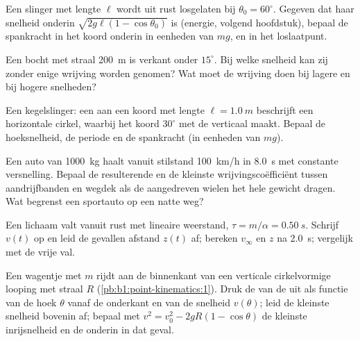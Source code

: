 \begin{exercise}[$\star\star$]\label{exo:b1:newton-dynamics:7}
Een slinger met lengte $\ell$ wordt uit rust losgelaten bij $\theta_0 = 60^\circ$.
Gegeven dat haar snelheid onderin $\sqrt{2g\ell(1 - \cos\theta_0)}$ is
(energie, volgend hoofdstuk), bepaal de spankracht in het koord onderin in eenheden
van $mg$, en in het loslaatpunt.
\end{exercise}

\begin{exercise}[$\star\star$]\label{exo:b1:newton-dynamics:8}
Een bocht met straal \qty{200}{m} is verkant onder $15^\circ$. Bij welke snelheid kan
zij zonder enige wrijving worden genomen? Wat moet de wrijving doen bij lagere en
bij hogere snelheden?
\end{exercise}

\begin{exercise}[$\star\star$]\label{exo:b1:newton-dynamics:9}
Een kegelslinger: een  aan een koord met lengte $\ell = \qty{1.0}{m}$
beschrijft een horizontale cirkel, waarbij het koord $30^\circ$ met de
verticaal maakt. Bepaal de hoeksnelheid, de periode en de spankracht (in
eenheden van $mg$).
\end{exercise}

\begin{exercise}[$\star\star\star$]\label{exo:b1:newton-dynamics:10}
Een auto van \qty{1000}{kg} haalt vanuit stilstand \qty{100}{km/h} in \qty{8.0}{s}
met constante versnelling. Bepaal de resulterende  en de kleinste
wrijvingscoëfficiënt tussen aandrijfbanden en wegdek als de aangedreven
wielen het hele gewicht dragen. Wat begrenst een sportauto op een natte weg?
\end{exercise}

\begin{exercise}[$\star\star\star$]\label{exo:b1:newton-dynamics:11}
Een lichaam valt vanuit rust met lineaire weerstand, $\tau = m/\alpha = \qty{0.50}{s}$.
Schrijf $v(t)$ op en leid de gevallen afstand $z(t)$ af; bereken $v_\infty$
en $z$ na \qty{2.0}{s}; vergelijk met de vrije val.
\end{exercise}

\begin{exercise}[$\star\star\star$]\label{exo:b1:newton-dynamics:12}
Een wagentje met  $m$ rijdt aan de binnenkant van een verticale cirkelvormige looping met
straal $R$ (\cref{pb:b1:point-kinematics:1}). Druk de  van de 
uit als functie van de hoek $\theta$ vanaf de onderkant en
van de snelheid $v(\theta)$; leid de kleinste snelheid bovenin af; bepaal met
$v^2 = v_0^2 - 2gR(1 - \cos\theta)$ de kleinste inrijsnelheid en
de  onderin in dat geval.
\end{exercise}

